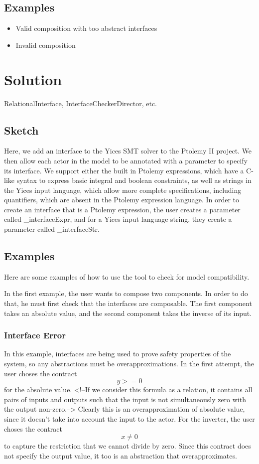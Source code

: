 \documentclass[preprint,11pt,authoryear]{sigplanconf}
\begin{document}
\subsection{Examples}
\begin{itemize}
	\item Valid composition with too abstract interfaces
	\item Invalid composition
\end{itemize}

\section{Solution}
RelationalInterface,
InterfaceCheckerDirector,
etc.

\subsection{Sketch}
Here, we add an interface to the Yices\cite{yices} SMT solver to the Ptolemy II\cite{ptII} project.  We then allow each actor in the model to be annotated with a parameter to specify its interface.  We support either the built in Ptolemy expressions, which have a C-like syntax to express basic integral and boolean constraints, as well as strings in the Yices input language, which allow more complete specifications, including quantifiers, which are absent in the Ptolemy expression language.  In order to create an interface that is a Ptolemy expression, the user creates a parameter called \_interfaceExpr, and for a Yices input language string, they create a parameter called \_interfaceStr.

\subsection{Examples}
Here are some examples of how to use the tool to check for model compatibility.

In the first example, the user wants to compose two components.  In order to do that, he must first check that the interfaces are composable.  The first component takes an absolute value, and the second component takes the inverse of its input.

\subsubsection{Interface Error}
In this example, interfaces are being used to prove safety properties of the system, so any abstractions must be overapproximations.  In the first attempt, the user choses the contract
\[
y >= 0
\]
for the absolute value.  <!--If we consider this formula as a relation, it contains all pairs of inputs and outputs such that the input is not simultaneously zero with the output non-zero.-->  Clearly this is an overapproximation of absolute value, since it doesn't take into account the input to the actor.
For the inverter, the user choses the contract
\[
x \ne 0
\]
to capture the restriction that we cannot divide by zero.  Since this contract does not specify the output value, it too is an abstraction that overapproximates.
\end{document}
